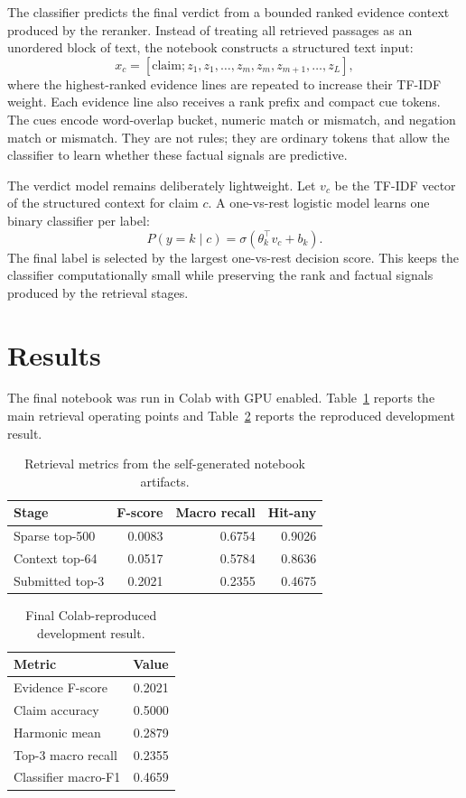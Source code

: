 \documentclass[11pt]{article}
\begin{document}
The classifier predicts the final verdict from a bounded ranked evidence context
produced by the reranker.  Instead of treating all retrieved passages as an
unordered block of text, the notebook constructs a structured text input:
\[
x_c=[\mathrm{claim}; z_1,z_1,\ldots,z_m,z_m,z_{m+1},\ldots,z_L],
\]
where the highest-ranked evidence lines are repeated to increase their TF-IDF
weight.  Each evidence line also receives a rank prefix and compact cue tokens.
The cues encode word-overlap bucket, numeric match or mismatch, and negation
match or mismatch.  They are not rules; they are ordinary tokens that allow the
classifier to learn whether these factual signals are predictive.

The verdict model remains deliberately lightweight.  Let $v_c$ be the TF-IDF
vector of the structured context for claim $c$.  A one-vs-rest logistic model
learns one binary classifier per label:
\[
P(y=k\mid c)=\sigma(\theta_k^\top v_c+b_k).
\]
The final label is selected by the largest one-vs-rest decision score.  This
keeps the classifier computationally small while preserving the rank and factual
signals produced by the retrieval stages.

\newpage

\section{Results}

The final notebook was run in Colab with GPU enabled.
Table~\ref{tab:retrieval} reports the main retrieval operating points and
Table~\ref{tab:final} reports the reproduced development result.

\begin{table}[t]
\centering
\small
\begin{tabular}{lrrr}
\toprule
Stage & F-score & Macro recall & Hit-any \\
\midrule
Sparse top-500 & 0.0083 & 0.6754 & 0.9026 \\
Context top-64 & 0.0517 & 0.5784 & 0.8636 \\
Submitted top-3 & 0.2021 & 0.2355 & 0.4675 \\
\bottomrule
\end{tabular}
\caption{Retrieval metrics from the self-generated notebook artifacts.}
\label{tab:retrieval}
\end{table}

\begin{table}[t]
\centering
\small
\begin{tabular}{lr}
\toprule
Metric & Value \\
\midrule
Evidence F-score & 0.2021 \\
Claim accuracy & 0.5000 \\
Harmonic mean & 0.2879 \\
Top-3 macro recall & 0.2355 \\
Classifier macro-F1 & 0.4659 \\
\bottomrule
\end{tabular}
\caption{Final Colab-reproduced development result.}
\label{tab:final}
\end{table}
\end{document}
